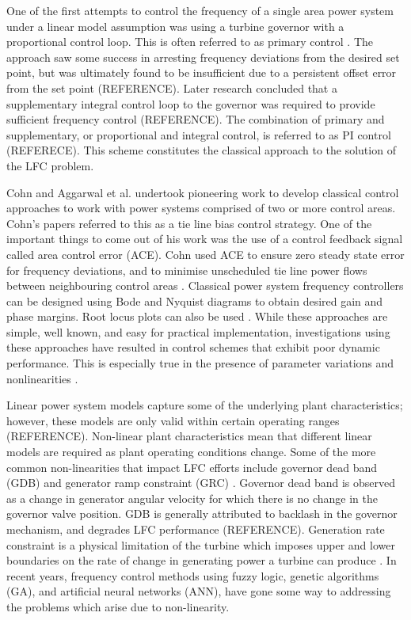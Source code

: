 One of the first attempts to control the frequency of a single area power system under a linear model assumption was using a turbine governor with a proportional control loop. This is often referred to as primary control \cite{Bevrani2011}. The approach saw some success in arresting frequency deviations from the desired set point, but was ultimately found to be insufficient due to a persistent offset error from the set point (REFERENCE). Later research concluded that a supplementary integral control loop to the governor was required to provide sufficient frequency control (REFERENCE). The combination of primary and supplementary, or proportional and integral control, is referred to as PI control (REFERECE). This scheme constitutes the classical approach to the solution of the LFC problem.

Cohn \cite{Cohn1971} and Aggarwal et al. \cite{Aggarwal1968, Aggarwal1968a} undertook pioneering work to develop classical control approaches to work with power systems comprised of two or more control areas. Cohn's papers referred to this as a tie line bias control strategy. One of the important things to come out of his work was the use of a control feedback signal called area control error (ACE). Cohn used ACE to ensure zero steady state error for frequency deviations, and to minimise unscheduled tie line power flows between neighbouring control areas \cite{Cohn1956}. Classical power system frequency controllers can be designed using Bode and Nyquist diagrams to obtain desired gain and phase margins. Root locus plots can also be used \cite{Ogat2010}. While these approaches are simple, well known, and easy for practical implementation, investigations using these approaches have resulted in control schemes that exhibit poor dynamic performance. This is especially true in the presence of parameter variations and nonlinearities \cite{Kundur1994, Elgerd1970, Bechert1977}.

Linear power system models capture some of the underlying plant characteristics; however, these models are only valid within certain operating ranges (REFERENCE). Non-linear plant characteristics mean that different linear models are required as plant operating conditions change. Some of the more common non-linearities that impact LFC efforts include governor dead band (GDB) \cite{Concordia1957} and generator ramp constraint (GRC) \cite{Kwatny1975, Elgerd1994}. Governor dead band is observed as a change in generator angular velocity for which there is no change in the governor valve position. GDB is generally attributed to backlash in the governor mechanism, and degrades LFC performance (REFERENCE). Generation rate constraint is a physical limitation of the turbine which imposes upper and lower boundaries on the rate of change in generating power a turbine can produce \cite{Morsali2014}. In recent years, frequency control methods using fuzzy logic, genetic algorithms (GA), and artificial neural networks (ANN), have gone some way to addressing the problems which arise due to non-linearity.

